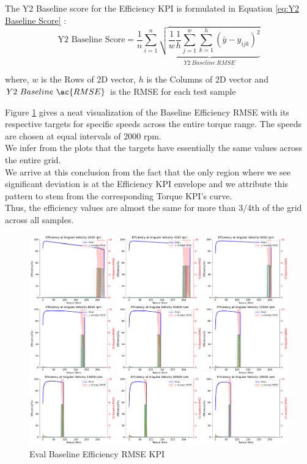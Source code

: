 \documentclass{report} %
\begin{document}
The Y2 Baseline score for the Efficiency \ac{KPI} is formulated in Equation \ref{eq:Y2 Baseline Score} :
\begin{equation}
    \text{Y2 Baseline Score} = \frac{1}{n} \sum_{i=1}^{n} \underbrace{ \sqrt{\frac{1}{w} \frac{1}{h} \sum_{j=1}^{w} \sum_{k=1}^{h} (\bar{y} - y_{ijk})^2}}_{Y2\ Baseline\ RMSE}
    \label{eq:Y2 Baseline Score}
\end{equation}
    
where, \(w\) is the Rows of 2\ac{D} vector, \(h\) is the Columns of 2\ac{D} vector and \(Y2\ Baseline\ \ac{RMSE}\) is the \ac{RMSE} for each test sample

Figure \ref{fig:Eval Baseline Efficiency RMSE KPI} gives a neat visualization of the Baseline Efficiency \ac{RMSE} with its respective targets for specific speeds across the entire torque range.
The speeds are chosen at equal intervals of 2000 rpm.\\
We infer from the plots that the targets have essentially the same values across the entire grid.\\
We arrive at this conclusion from the fact that the only region where we see significant deviation is at the Efficiency \ac{KPI} envelope and we attribute this pattern to stem from the corresponding Torque \ac{KPI}'s curve. \\
Thus, the efficiency values are almost the same for more than 3/4th of the grid across all samples.\\
\begin{figure}[H]
    \centering
    \includegraphics[width=1\textwidth]{./ReportImages/rmse_eta_Baseline.png} 
    \caption{Eval Baseline Efficiency \ac{RMSE} \ac{KPI}} 
    \label{fig:Eval Baseline Efficiency RMSE KPI}
\end{figure}
\end{document}
